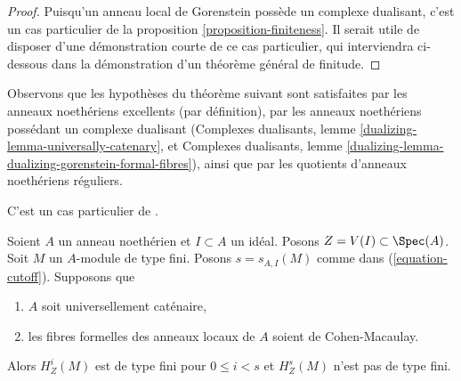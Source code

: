\begin{proof}
Puisqu'un anneau local de Gorenstein possède un complexe dualisant, c'est un cas particulier de la proposition \ref{proposition-finiteness}. Il serait utile de disposer d'une démonstration courte de ce cas particulier, qui interviendra ci-dessous dans la démonstration d'un théorème général de finitude.
\end{proof}

\noindent
Observons que les hypothèses du théorème suivant sont satisfaites par les anneaux noethériens excellents (par définition), par les anneaux noethériens possédant un complexe dualisant (Complexes dualisants, lemme \ref{dualizing-lemma-universally-catenary}, et Complexes dualisants, lemme \ref{dualizing-lemma-dualizing-gorenstein-formal-fibres}), ainsi que par les quotients d'anneaux noethériens réguliers.

\begin{theorem}
\label{theorem-finiteness}
\begin{reference}
C'est un cas particulier de \cite[Satz 2]{Faltings-finiteness}.
\end{reference}
Soient $A$ un anneau noethérien et $I \subset A$ un idéal. Posons $Z = V(I) \subset \Spec(A)$. Soit $M$ un $A$-module de type fini. Posons $s = s_{A, I}(M)$ comme dans (\ref{equation-cutoff}). Supposons que
\begin{enumerate}
\item $A$ soit universellement caténaire,
\item les fibres formelles des anneaux locaux de $A$ soient de Cohen-Macaulay.
\end{enumerate}
Alors $H^i_Z(M)$ est de type fini pour $0 \leq i < s$ et $H^s_Z(M)$ n'est pas de type fini.
\end{theorem}

